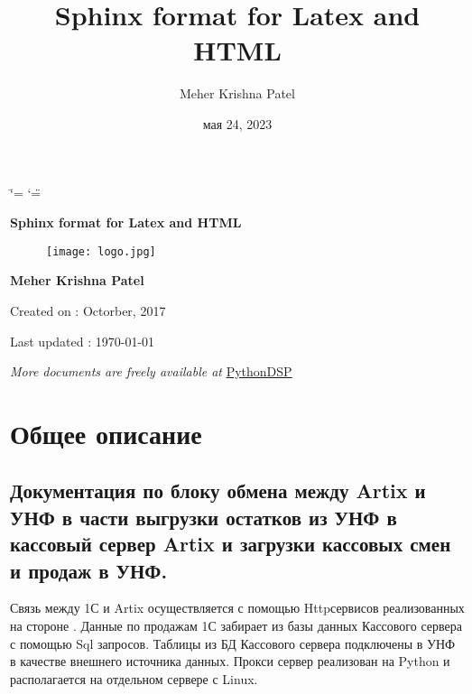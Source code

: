 \documentclass[a4paper,10pt,russian]{report}
\title{Sphinx format for Latex and HTML}
\date{мая 24, 2023}
\author{Meher Krishna Patel}
\begin{document}
\ifdefined\shorthandoff
  \ifnum\catcode`\=\string=\active\shorthandoff{=}\fi
  \ifnum\catcode`\"=\active{}\fi
\fi

\pagestyle{empty}


        \begin{titlepage}
            \centering

            \vspace*{40mm} %
            \textbf{\Huge {Sphinx format for Latex and HTML}}

            \vspace{0mm}
            \begin{figure}[!h]
                \centering
                \texttt{[image: logo.jpg]}
            \end{figure}

            \vspace{0mm}
            \Large \textbf{{Meher Krishna Patel}}

            \small Created on : Octorber, 2017

            \vspace*{0mm}
            \small  Last updated : \MonthYearFormat\today


            \vfill
            \small \textit{More documents are freely available at }{\href{http://pythondsp.readthedocs.io/en/latest/pythondsp/toc.html}{PythonDSP}}
        \end{titlepage}

        \clearpage
        \tableofcontents
        \listoffigures
        \listoftables
        \clearpage

        
\pagestyle{plain}
 
\pagestyle{normal}
\label{\detokenize{index::doc}}


\sphinxstepscope


\chapter{Общее описание}
\label{\detokenize{description:id1}}\label{\detokenize{description::doc}}

\section{Документация по блоку обмена между Artix и УНФ в части выгрузки остатков из УНФ в кассовый сервер Artix и загрузки кассовых смен и продаж в УНФ.}
\label{\detokenize{description:artix-artix}}
\sphinxAtStartPar
Связь между 1С и Artix осуществляется с помощью Http\sphinxhyphen{}сервисов реализованных на стороне . Данные по продажам 1С забирает из базы данных
Кассового сервера с помощью Sql запросов. Таблицы из БД Кассового сервера подключены в УНФ в качестве внешнего источника данных.
Прокси сервер реализован на Python и располагается на отдельном сервере с Linux.
\end{document}
